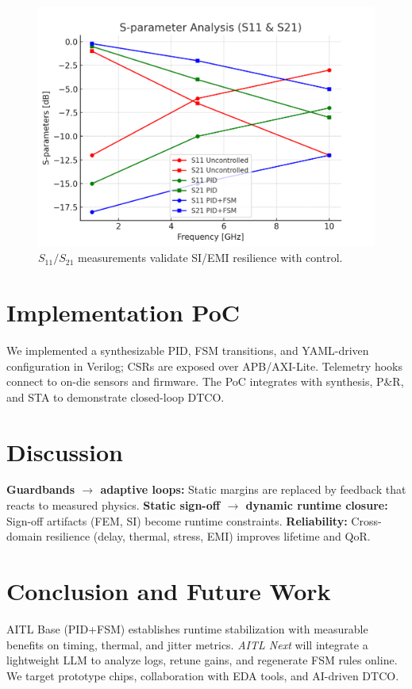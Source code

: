 \documentclass[conference]{IEEEtran}
\begin{document}
\begin{figure}[t]
\centering
\includegraphics[width=0.95\linewidth]{figs/sparam_s11s21.png}
\caption{$S_{11}/S_{21}$ measurements validate SI/EMI resilience with control.}
\label{fig:sparam}
\end{figure}

\section{Implementation PoC}
We implemented a synthesizable PID, FSM transitions, and YAML-driven configuration in Verilog; CSRs are exposed over APB/AXI-Lite. Telemetry hooks connect to on-die sensors and firmware. The PoC integrates with synthesis, P\&R, and STA to demonstrate closed-loop DTCO.

\section{Discussion}
\textbf{Guardbands $\rightarrow$ adaptive loops:} Static margins are replaced by feedback that reacts to measured physics.  
\textbf{Static sign-off $\rightarrow$ dynamic runtime closure:} Sign-off artifacts (FEM, SI) become runtime constraints.  
\textbf{Reliability:} Cross-domain resilience (delay, thermal, stress, EMI) improves lifetime and QoR.

\section{Conclusion and Future Work}
AITL Base (PID+FSM) establishes runtime stabilization with measurable benefits on timing, thermal, and jitter metrics. \emph{AITL Next} will integrate a lightweight LLM to analyze logs, retune gains, and regenerate FSM rules online. We target prototype chips, collaboration with EDA tools, and AI-driven DTCO.
\end{document}
